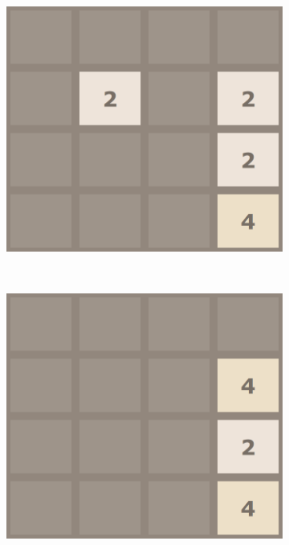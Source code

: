 \documentclass[11pt,a4paper]{article}
\begin{document}
\begin{figure}[h!]
    \centering
    \begin{subfigure}[b]{0.22\textwidth}
        \includegraphics[width=\textwidth]{figures/1}
    \end{subfigure}
    ~
    \begin{subfigure}[b]{0.22\textwidth}
        \includegraphics[width=\textwidth]{figures/2}
    \end{subfigure}

\end{figure}
\end{document}
